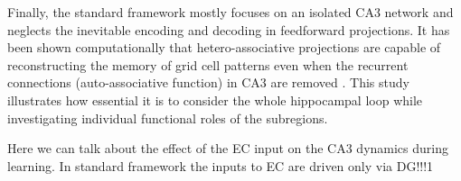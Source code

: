 \documentclass[utf8]{frontiersSCNS} %
\begin{document}


Finally, the standard framework mostly focuses on an isolated CA3 network and neglects the inevitable encoding and decoding in feedforward projections. It has been shown computationally that hetero-associative projections are capable of reconstructing the memory of grid cell patterns even when the recurrent connections (auto-associative function) in CA3 are removed \citep{neher2015memory}. This study illustrates how essential it is to consider the whole hippocampal loop while investigating individual functional roles of the subregions. 

Here we can talk about the effect of the EC input on the CA3 dynamics during learning. In standard framework the inputs to EC are driven only via DG!!!1 
\end{document}
